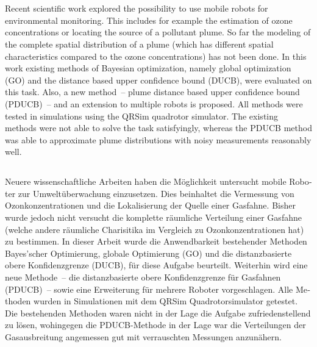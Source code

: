 \documentclass[11pt,a4paper,twoside,BCOR=15mm,listof=totoc,parskip=never]{scrbook}
\begin{document}
\cleardoublepage\thispagestyle{empty}
\vspace*{\fill}
\section*{\abstractname}
Recent scientific work explored the possibility to use mobile robots for 
environmental monitoring. This includes for example the estimation of ozone 
concentrations or locating the source of a pollutant plume. So far the modeling 
of the complete spatial distribution of a plume (which has different spatial 
characteristics compared to the ozone concentrations) has not been done.  In 
this work existing methods of Bayesian optimization, namely global optimization 
(GO) and the distance based upper confidence bound (DUCB), were evaluated on 
this task.  Also, a new method~-- plume distance based upper confidence bound 
(PDUCB)~-- and an extension to multiple robots is proposed.  All methods were 
tested in simulations using the QRSim quadrotor simulator. The existing methods 
were not able to solve the task satisfyingly, whereas the PDUCB method was able 
to approximate plume distributions with noisy measurements reasonably well.

\begin{german}
\section*{\abstractname}
Neuere wissenschaftliche Arbeiten haben die Möglichkeit untersucht mobile 
Roboter zur Umweltüberwachung einzusetzen. Dies beinhaltet die Vermessung von 
Ozonkonzentrationen und die Lokalisierung der Quelle einer Gasfahne. Bisher 
wurde jedoch nicht versucht die komplette räumliche Verteilung einer Gasfahne 
(welche andere räumliche Charisitika im Vergleich zu Ozonkonzentrationen hat) zu 
bestimmen.  In dieser Arbeit wurde die Anwendbarkeit bestehender Methoden 
Bayes'scher Optimierung, globale Optimierung (GO) und die distanzbasierte obere 
Konfidenzgrenze (DUCB), für diese Aufgabe beurteilt.  Weiterhin wird eine neue 
Methode~-- die distanzbasierte obere Konfidenzgrenze für Gasfahnen (PDUCB)~-- 
sowie eine Erweiterung für mehrere Roboter vorgeschlagen.  Alle Methoden wurden 
in Simulationen mit dem QRSim Quadrotorsimulator getestet.  Die bestehenden 
Methoden waren nicht in der Lage die Aufgabe zufriedenstellend zu lösen, 
wohingegen die PDUCB-Methode in der Lage war die Verteilungen der Gasausbreitung 
angemessen gut mit verrauschten Messungen anzunähern.
\end{german}
\vspace*{\fill}
\end{document}
